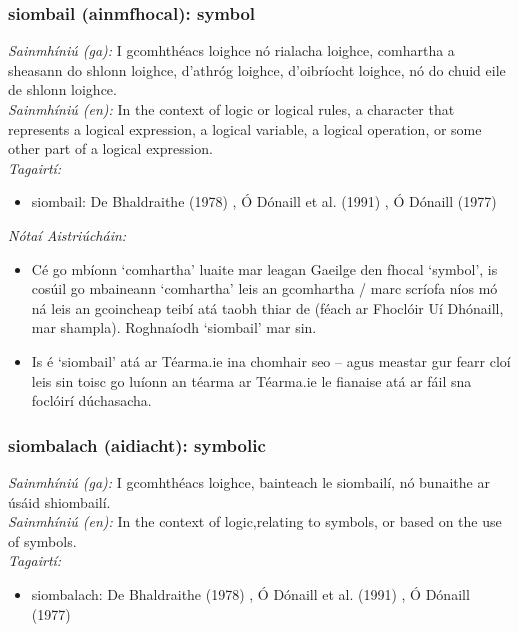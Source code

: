 \subsubsection*{siombail (ainmfhocal): symbol}
 \noindent \textit{Sainmhíniú (ga):} I gcomhthéacs loighce nó rialacha loighce, comhartha a sheasann do shlonn loighce, d'athróg loighce, d'oibríocht loighce, nó do chuid eile de shlonn loighce.
\\
 \noindent \textit{Sainmhíniú (en):} In the context of logic or logical rules, a character that represents a logical expression, a logical variable, a logical operation, or some other part of a logical expression.
\\
 \noindent \textit{Tagairtí:}
\begin{itemize}
	\item siombail: De Bhaldraithe (1978) \cite{de-bhaldraithe}, Ó Dónaill et al. (1991) \cite{focloir-beag}, Ó Dónaill (1977) \cite{odonaill}
\end{itemize}

 \noindent \textit{Nótaí Aistriúcháin:}
\begin{itemize}
	\item Cé go mbíonn `comhartha' luaite mar leagan Gaeilge den fhocal `symbol', is cosúil go mbaineann `comhartha' leis an gcomhartha / marc scríofa níos mó ná leis an gcoincheap teibí atá taobh thiar de (féach ar Fhoclóir Uí Dhónaill, mar shampla). Roghnaíodh `siombail' mar sin.
	\item Is é `siombail' atá ar Téarma.ie ina chomhair seo -- agus meastar gur fearr cloí leis sin toisc go luíonn an téarma ar Téarma.ie le fianaise atá ar fáil sna foclóirí dúchasacha.
\end{itemize}


\subsubsection*{siombalach (aidiacht): symbolic}
 \noindent \textit{Sainmhíniú (ga):} I gcomhthéacs loighce, bainteach le siombailí, nó bunaithe ar úsáid shiombailí.
\\
 \noindent \textit{Sainmhíniú (en):} In the context of logic,relating to symbols, or based on the use of symbols.
\\
 \noindent \textit{Tagairtí:}
\begin{itemize}
	\item siombalach: De Bhaldraithe (1978) \cite{de-bhaldraithe}, Ó Dónaill et al. (1991) \cite{focloir-beag}, Ó Dónaill (1977) \cite{odonaill}
\end{itemize}


